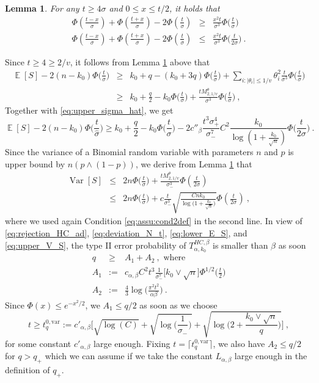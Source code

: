 \documentclass[twoside,11pt]{article}
\newtheorem{lem}{Lemma}
\def\beq{\begin{equation}}
\def\eeq{\end{equation}}
\def\beqn{\begin{eqnarray*}}
\def\eeqn{\end{eqnarray*}}
\newcommand{\E}{\operatorname{\mathbb{E}}}
\newcommand{\Var}{\operatorname{Var}}
\newcommand{\<}{\langle}
\renewcommand{\>}{\rangle}
\begin{document}
\begin{lem}\label{lem:phidiff}
For any $t\geq 4\sigma$ and  $0 \leq x \leq t/2$, it holds that 
\beqn
\Phi(\frac{t - x}{\sigma}) + \Phi(\frac{t + x}{\sigma}) - 2\Phi(\frac{t}{\sigma}) &\geq &\frac{x^2t}{\sigma^3} \Phi\big(\frac{t}{\sigma}\big)\\
\Phi(\frac{t-x}{\sigma}) + \Phi(\frac{t+x}{\sigma}) -  2\Phi(\frac{t}{\sigma}) &
\leq& 
 \frac{x^2t}{\sigma^3}  \Phi\big(\frac{t}{2\sigma}\big)\ .
\eeqn
\end{lem}
Since $t\geq 4\geq 2/v$, it follows from Lemma \ref{lem:phidiff} above that 
\beqn
\E[S]-2(n-k_0)\Phi\big(\frac{t}{\sigma}\big)&\geq& k_0+q  -(k_0+3q)\Phi\big(\frac{t}{\sigma}\big)  + \sum_{i: |\theta_i|\leq 1/v}\theta_i^2  \frac{t}{\sigma^3}\Phi\big(\frac{t}{\sigma}\big)\\
&\geq & k_0+\frac{q}{2}  -k_0\Phi\big(\frac{t}{\sigma}\big)  +  \frac{tM_{2,1/v}^{\theta}}{\sigma^3}\Phi\big(\frac{t}{\sigma}\big)\ ,
\eeqn 
 Together with \eqref{eq:upper_sigma_hat}, we get
\beq\label{eq:lower_E_S}
\E[S]-2(n-k_0)\Phi\big(\frac{t}{\widehat{\sigma}}\big)\geq k_0+\frac{q}{2}  -k_0\Phi\big(\frac{t}{\sigma}\big)   - 2c''_{\beta}\frac{t^3\sigma_+^4}{\sigma_-^7} C^2\frac{k_0}{\log(1+\frac{k_0}{\sqrt{n}})}\Phi\big(\frac{t}{2\sigma}\big)\ .
\eeq 
Since the variance of a Binomial random variable with parameters $n$ and $p$ is upper bound by $n(p\wedge (1-p))$, we derive from Lemma \ref{lem:phidiff} that
\begin{eqnarray}
 \nonumber
\Var[S]&\leq& 2n\Phi\big(\frac{t}{\sigma}\big)+ \frac{tM_{2,1/v}^{\theta}}{\sigma_{-}^3}\Phi(\frac{t}{2\sigma})\\
\label{eq:upper_V_S}
 &\leq & 2n\Phi\big(\frac{t}{\sigma}\big)+ c \frac{t}{\sigma_{-}^3} \sqrt{\frac{Cnk_0}{\log\big(1+\frac{k_0}{\sqrt{n}})}}\Phi(\frac{t}{2\sigma})\ ,
\end{eqnarray}
where we used again Condition \eqref{eq:assu:cond2def} in the second line. In view of \eqref{eq:rejection_HC_ad}, \eqref{eq:deviation_N_t}, \eqref{eq:lower_E_S}, and \eqref{eq:upper_V_S}, the type II error probability of $T^{HC,\beta}_{\alpha,k_0}$ is smaller than $\beta$ as soon
\beqn
q&\geq& A_1+ A_2 \ , \text{ where}\\
A_1&:=& c_{\alpha,\beta} C^2t^3  \frac{1}{\sigma_-^7}  \big[k_0\vee \sqrt{n}\big]\Phi^{1/2}\big(\frac{t}{2}\big) \\
A_2&:=& \frac{4}{3}\log\big(\frac{ \pi^2 t^2 }{\alpha\beta}\big)\ .
\eeqn
Since $\Phi(x)\leq e^{-x^2/2}$, we  $A_1\leq q/2$ as soon as we choose 
\beq\label{eq:def_t_0q}
 t\geq t_q^{0,\mathrm{var}}:=  c'_{\alpha,\beta}\Big[\sqrt{\log(C)}+ \sqrt{\log\big(\frac{1}{\sigma_{-}}\big)}+ \sqrt{\log\Big(2+ \frac{k_0\vee \sqrt{n}}{q}\Big)}\Big]\ ,
 \eeq
for some constant $c'_{\alpha,\beta}$ large enough.
Fixing $t= \lceil t_q^{0,\mathrm{var}}\rceil$, we also have $A_2\leq q/2$ for $q> q_+$ which we can  assume if we take the constant $L_{\alpha,\beta}$ large enough in the definition of $q_+$. 
\end{document}
